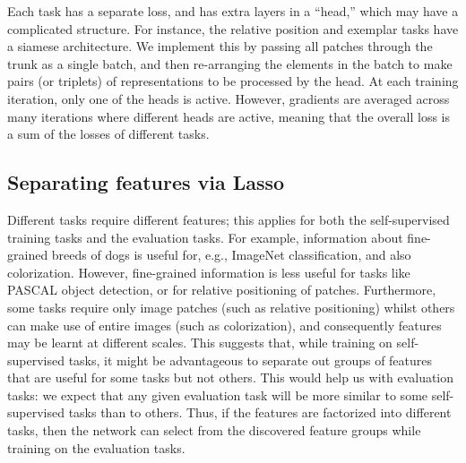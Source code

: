 \documentclass[10pt,twocolumn,letterpaper]{article}
\begin{document}
Each task has a separate loss, and has extra layers in a ``head,'' which may have a complicated structure.
For instance, the relative position and exemplar tasks have a siamese architecture.
We implement this by passing all patches through the trunk as a single batch, and then re-arranging the elements in the batch to make pairs (or triplets) of representations to be processed by the head.
At each training iteration, only one of the heads is active.
However, gradients are averaged across many iterations where different heads are active, meaning that the overall loss is a sum of the losses of different tasks.


\subsection{Separating features via Lasso}
\label{sec:lasso}


Different tasks require different features; this applies for both
the self-supervised training tasks and the evaluation tasks.  
For example, information
about fine-grained breeds of dogs is useful for, e.g., ImageNet
classification, and also colorization.  However, fine-grained
information is less useful for tasks like PASCAL object detection, or
for relative positioning of patches.  Furthermore, some tasks require
only image patches (such as relative positioning) whilst others can
make use of entire images (such as colorization), and consequently
features may be learnt at different scales.  This suggests that, while
training on self-supervised tasks, it might be advantageous to
separate out groups of features that are useful for some tasks but not
others.  This would help us with evaluation tasks: we expect that any
given evaluation task will be more similar to some self-supervised
tasks than to others.  Thus, if the features are factorized into
different tasks, then the network can select from the discovered
feature groups while training on the evaluation tasks.
\end{document}
